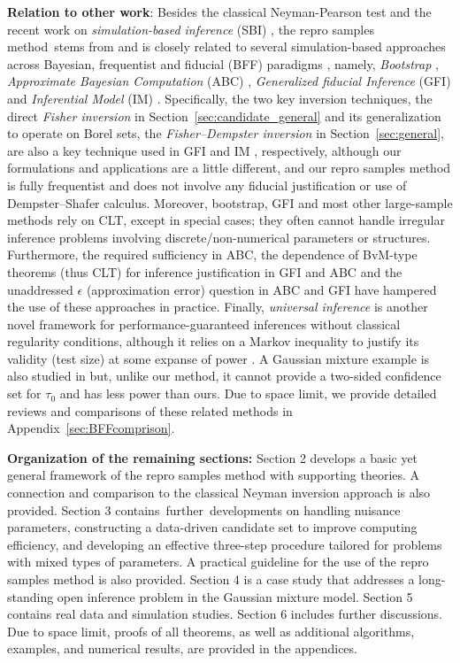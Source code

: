 \documentclass[12pt]{article}
\theoremstyle{shortspace}
\begin{document}
\vspace{-2mm}
\noindent
{\bf Relation to other work}: 
 Besides
the classical Neyman-Pearson test and the recent work on {\it simulation-based inference} (SBI) \citep{dalmasso2022},
the repro samples method~stems from and is closely related to several simulation-based approaches across Bayesian, frequentist and fiducial (BFF) paradigms \citep{Berger2020},  namely,  {\it Bootstrap} \citep{EfroTibs93},  {\it Approximate Bayesian Computation} (ABC) \citep{Robert2016}, 
{\it Generalized fiducial Inference} (GFI) \citep{Hannig2016} and {\it Inferential Model} (IM) \citep{Martin2015}. 
Specifically, the two key inversion techniques, the direct {\it Fisher inversion} 
in Section~\ref{sec:candidate_general} and its generalization to operate on Borel sets, the {\it Fisher--Dempster inversion}  
in Section~\ref{sec:general}, are also a key technique used in GFI \citep{Hannig2016} and IM \citep{Martin2015}, respectively, although our formulations and applications are a little different, and our repro samples method is fully frequentist and does not involve any fiducial justification or use of Dempster--Shafer calculus.
Moreover, 
bootstrap, GFI and most other large-sample methods
rely on CLT, except in  
special cases; they often cannot handle irregular inference problems involving discrete/non-numerical parameters or structures. Furthermore, 
the required sufficiency in ABC, the dependence of BvM-type theorems (thus CLT) for inference justification in GFI and ABC \citep{Hannig2016, Li2016} and the unaddressed 
$\epsilon$ (approximation error) question \citep{Li2016} in ABC and GFI have hampered the use of these approaches in practice.  
Finally, 
{\it universal inference} \citep{wasserman2020universal} is  another novel framework 
for performance-guaranteed  
inferences
without classical regularity conditions, although it relies on a Markov inequality to justify its validity (test size) at some expanse of power \citep{Dunn2022, TseDavison2023}.  
A Gaussian mixture example is also studied in \cite{wasserman2020universal} but, unlike our method, it cannot provide a two-sided confidence set for $\tau_0$ and has less power than ours. 
Due to space limit, we provide detailed reviews and comparisons of these related methods in Appendix~\ref{sec:BFFcomprison}.


\noindent
{\bf Organization of the remaining sections:} 
Section 2 develops a basic yet general framework of the repro samples method with supporting theories. A connection and comparison to the classical Neyman inversion approach
is also provided.  
Section 3 contains~further~developments on handling nuisance parameters,  
constructing a data-driven candidate set to improve computing efficiency, and developing an effective three-step procedure tailored 
for problems with mixed types of parameters. A practical guideline for the use of the repro samples method is also provided.
Section 4 is a case study that addresses a long-standing open inference problem in the Gaussian mixture model. 
Section 5 contains real data and simulation studies.
Section 6 includes further discussions.  
Due to space limit, proofs of all theorems,
as well as additional algorithms, examples, and numerical results, are provided in the appendices.
\end{document}
